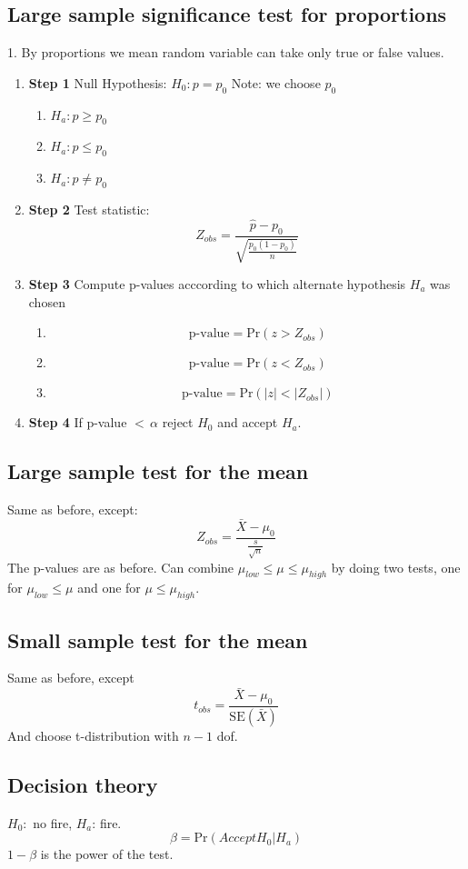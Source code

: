 \documentclass{article}
\newcommand{\beq}{\begin{equation}}
\newcommand{\eeq}{\end{equation}}
\begin{document}
\subsection{Large sample significance test for proportions}
1. By proportions we mean random variable can take only true or false values.
\begin{enumerate}
\item{{\textbf{Step 1}} Null Hypothesis: $H_0: p = p_0$ Note: we choose $p_0$}
  \begin{enumerate}[label=(\alph*)]
  \item{$H_a: p \ge p_0$}
  \item{$H_a: p \le p_0$}
  \item{$H_a: p \ne p_0$}  
  \end{enumerate}
\item{{\textbf{Step 2}} Test statistic:  \beq Z_{obs} = \frac{\hat{p}-p_0}{\sqrt{\frac{p_0(1-p_0)}{n}}} \eeq}
\item{{\textbf{Step 3}} Compute p-values acccording to which alternate hypothesis $H_a$ was chosen}
  \begin{enumerate}[label=(\alph*)]
  \item{\beq\text{p-value}=\text{Pr}(z>Z_{obs})\eeq}
  \item{\beq\text{p-value}=\text{Pr}(z<Z_{obs})\eeq}
  \item{\beq\text{p-value}=\text{Pr}(|z|<|Z_{obs}|)\eeq}
  \end{enumerate}
\item{{\textbf{Step 4}} If p-value $<\,\alpha$ reject $H_0$ and accept $H_a$.}
\end{enumerate}
\subsection{Large sample test for the mean}
Same as before, except:
\beq
Z_{obs} = \frac{\bar{X}-\mu_0}{\frac{s}{\sqrt{n}}}
\eeq
The p-values are as before. Can combine $\mu_{low} \le \mu \le \mu_{high}$ by doing two tests, one for $\mu_{low} \le \mu$ and one for $\mu \le \mu_{high}$.
\subsection{Small sample test for the mean}
Same as before, except
\beq
t_{obs} = \frac{\bar{X}-\mu_0}{\text{SE}(\bar{X})}
\eeq
And choose t-distribution with $n-1$ dof.
\subsection{Decision theory}
$H_0:$ no fire, $H_a$: fire.
\beq
\beta = \text{Pr}(Accept H_0 | H_a)
\eeq
$1-\beta$ is the power of the test.
\end{document}
